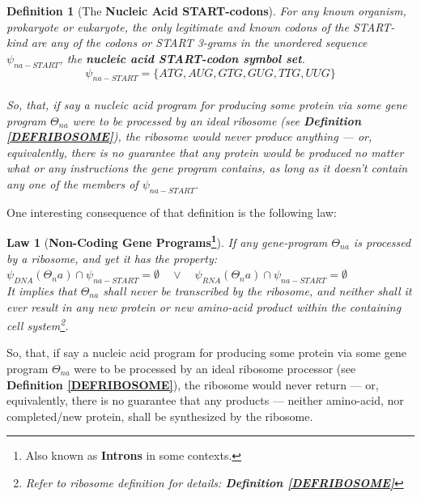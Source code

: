 \documentclass[a4paper, 18pt]{book} %
\newtheorem{defn}{Definition}
\newtheorem{law}{Law}
\begin{document}
\begin{defn}[The \textbf{Nucleic Acid START-codons}]
\label{DEFSTARTCOD}
For any known organism, prokaryote or eukaryote, the only legitimate and known codons of the START-kind are any of the codons or START 3-grams in the unordered sequence $\psi_{na-START}$, the \textbf{nucleic acid START-codon symbol set}.\\

\begin{equation}
\label{EQNNASSS}
\psi_{na-START} = \{ATG,AUG,GTG,GUG,TTG,UUG\}
\end{equation}\\

So, that, if say a nucleic acid program for producing some protein via some gene program $\Theta_{na}$ were to be processed by an ideal ribosome (see \textbf{Definition \ref{DEFRIBOSOME}}), the ribosome would never produce anything --- or, equivalently, there is no guarantee that any protein would be produced no matter what or any instructions the gene program contains, as long as it doesn't contain any one of the members of $\psi_{na-START}$.
\end{defn} 

One interesting consequence of that definition is the following law:

\begin{law}[\textbf{Non-Coding Gene Programs\footnote{Also known as \textbf{Introns} in some contexts.}}]
\label{LAW2}
If any gene-program $\Theta_{na}$ is processed by a ribosome, and yet it has the property:\\

 $\psi_{DNA}(\Theta_na) \cap \psi_{na-START} = \emptyset \quad \lor \quad \psi_{RNA}(\Theta_na) \cap \psi_{na-START} = \emptyset$\\
 
It implies that $\Theta_{na}$ shall never be transcribed by the ribosome, and neither shall it ever result in any new protein or new amino-acid product within the containing cell system\footnote{Refer to ribosome definition for details: \textbf{Definition \ref{DEFRIBOSOME}}}.
\end{law}


So, that, if say a nucleic acid program for producing some protein via some gene program $\Theta_{na}$ were to be processed by an ideal ribosome processor (see \textbf{Definition \ref{DEFRIBOSOME}}), the ribosome would never return --- or, equivalently, there is no guarantee that any products --- neither amino-acid, nor completed/new protein, shall be synthesized by the ribosome.
\end{document}
